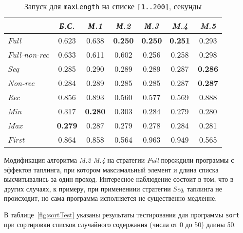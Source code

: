 \begin{table}[h!]
\center
\begin{tabular}{|l|c|c|c|c|c|c|}
\hline
                  &{\it Б.С.}   &{\it М.1}      &{\it М.2}      &{\it М.3}&{\it M.4} & {\it M.5}\\ \hline
{\it Full        } & 0.623        & 0.638       & {\bf 0.250}  & {\bf 0.250} & {\bf 0.251} & 0.293 \\ \hline
{\it Full-non-rec} & 0.633        & 0.611       & 0.602        & 0.256       & 0.258 & 0.298 \\ \hline
{\it Seq         } & 0.285        & 0.290       & 0.289        & 0.289       & 0.287 & {\bf 0.286} \\ \hline
{\it Non-rec     } & 0.284        & 0.289       & 0.285        & 0.285       & 0.287 & {\bf 0.287} \\ \hline
{\it Rec         } & 0.856        & 0.893       & 0.560        & 0.577       & 0.569 & 0.888 \\ \hline
{\it Min         } & 0.317        & {\bf 0.280} & 0.303        & 0.284       & 0.279 & 0.280 \\ \hline
{\it Max         } & {\bf 0.279}  & 0.287       & 0.279        & 0.278       & 0.284 & 0.281 \\ \hline
{\it First       } & 0.864        & 0.858       & 0.564        & 0.963       & 0.949 & 0.565 \\ \hline


\end{tabular}
\caption{Запуск для \lstinline{maxLength} на списке \lstinline{[1..200]}, секунды}
\label{fig:maxlenTest}
\end{table}

Модификация алгоритма {\it M.2-M.4} на стратегии {\it Full} порождили программы
с эффектов таплинга, при котором максимальный элемент и длина списка высчитывались
за один проход. Интересное наблюдение состоит в том, что в других случаях, к примеру,
при применениии стратегии {\it Seq}, таплинга не происходит, но сама программа
исполняется не существенно медленне.

В таблице~\ref{fig:sortTest} указаны результаты тестирования для
программы \lstinline{sort} при сортировки списков случайного содержания (числа от 0 до 50)
длины 50.

